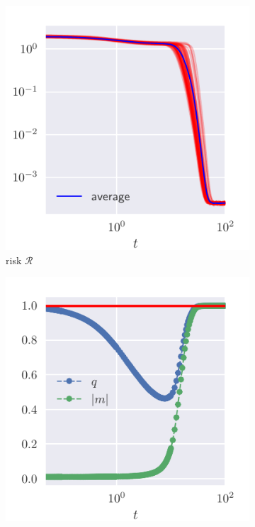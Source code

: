 \begin{figure}
  \centering
  \begin{subfigure}{0.495\textwidth}
    \includegraphics[width=1.\textwidth]{figures/unconstraned-phase-retrivial-risk.pdf}
    \caption{risk \(\mathcal{R}\)}
  \end{subfigure}
  \begin{subfigure}{0.495\textwidth}
    \includegraphics[width=1.\textwidth]{figures/unconstraned-phase-retrivial-qm.pdf}

\end{subfigure}
\end{figure}
